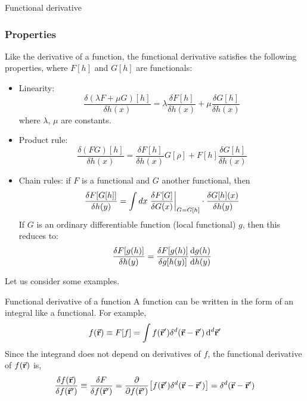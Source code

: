 \documentclass[../main/main.tex]{subfiles}
\begin{document}
\begin{definition}{Functional derivative}{}
\subsubsection{Properties}
Like the derivative of a function, the functional derivative satisfies the following properties, where \( F[h] \) and \( G[h] \) are functionals:
\begin{itemize}
\item Linearity:
\begin{equation*}
  {\frac  {\delta (\lambda F+\mu G)[h ]}{\delta h (x)}}=\lambda {\frac  {\delta F[h ]}{\delta h (x)}}+\mu {\frac  {\delta G[h ]}{\delta h(x)}}
\end{equation*}
where \( \lambda\), \(\mu  \) are constants.
\item Product rule:
\begin{equation*}
{\frac  {\delta (FG)[h ]}{\delta h(x)}}={\frac  {\delta F[h ]}{\delta h (x)}}G[\rho ]+F[h]{\frac  {\delta G[h ]}{\delta h (x)}}
\end{equation*}
\item Chain rules:
if \( F \)  is a functional and \( G \)  another functional, then
\begin{equation*}
  \frac{\delta F[G[h]] }{\delta h(y)}  = \int dx \eval{\frac{\delta F[G]}{\delta G(x)}}_{G = G[h]} \cdot\frac {\delta G[h](x)} {\delta h(y)}
\end{equation*}
If \( G \)  is an ordinary differentiable function (local functional) \( g \), then this reduces to:
\begin{equation*}
   {\frac {\delta F[g( h )]}{\delta h(y)}}={\frac {\delta F[g( h)]}{\delta g[h (y)]}} \dv{g(h )}{ h(y)}
\end{equation*}
\end{itemize}
\end{definition}

Let us consider some examples.

\begin{example}{Functional derivative of a function}{}
A function can be written in the form of an integral like a functional. For example,
\begin{equation*}
  f(\va{r}) \equiv F[ f ] = \int f ( \va{r}') \delta^d(\va{r}-\va{r}')\dd[d]{\va{r}'}
\end{equation*}
Since the integrand does not depend on derivatives of \( f \), the functional derivative of \(   f(\va{r})  \)  is,
\begin{equation}
  \frac{\delta f (\va{r})}{\delta f (\va{r}')} \equiv \frac{\delta F}{\delta f (\va{r}')}
  =\pdv{}{f (\va{r}')}  \qty[ f ( \va{r}') \delta^d (\va{r}-\va{r}')] =  \delta^d (\va{r}-\va{r}')
  \label{eq:17_12}
\end{equation}

\end{example}
\end{document}

